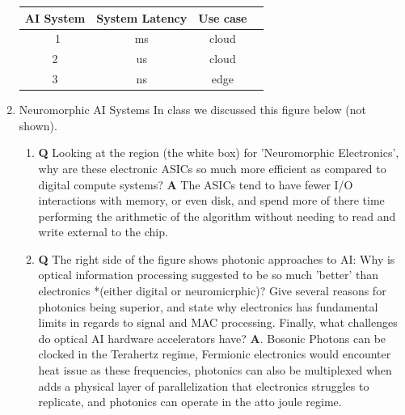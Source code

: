 \documentclass[main.tex]{subfiles}
\begin{document}
\begin{enumerate}
    \begin{center}
    \begin{tabular}{||c c c c||} 
     \hline
     AI System & System Latency & Use case \\ [0.5ex] 
     \hline\
     1 & ms & cloud \\ 
     \hline
     2 & us & cloud\\
     \hline
     3 & ns & edge \\ [1ex] 
     \hline
    \end{tabular}
    \end{center}
    
    \item Neuromorphic AI Systems In class we discussed this figure below (not shown).
    \begin{enumerate}
        \item \textbf{Q} Looking at the region (the white box) for 'Neuromorphic Electronics', why are these electronic ASICs so much more efficient as compared to digital compute systems? \textbf{A} The ASICs tend to have fewer I/O interactions with memory, or even disk, and spend more of there time performing the arithmetic of the algorithm without needing to read and write external to the chip.
        \item \textbf{Q} The right side of the figure shows photonic approaches to AI: Why is optical information processing suggested to be so much 'better' than electronics *(either digital or neuromicrphic)? Give several reasons for photonics being superior, and state why electronics has fundamental limits in regards to signal and MAC processing. Finally, what challenges do optical AI hardware accelerators have? \textbf{A}. Bosonic Photons can be clocked in the Terahertz regime, Fermionic electronics would encounter heat issue as these frequencies, photonics can also be multiplexed when adds a physical layer of parallelization that electronics struggles to replicate, and photonics can operate in the atto joule regime.
    \end{enumerate}
    
\end{enumerate}
\end{document}
